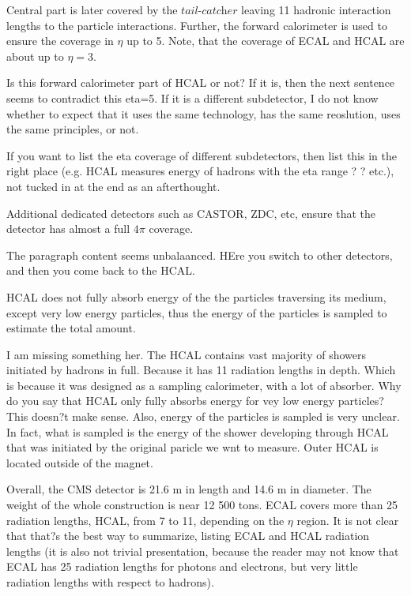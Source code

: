    
   Central part is later covered by the $\textit{tail-catcher}$ leaving 11 hadronic interaction lengths to the particle interactions.  
Further, the forward calorimeter is used to ensure the coverage in $\eta$ up to 5. Note, that the coverage of ECAL and HCAL are about up to $\eta=3$.  

Is this forward calorimeter part of HCAL or not? If it is, then the next sentence seems to contradict this eta=5. If it is a different subdetector, I do not know whether to expect that it uses the same technology, has the same reoslution, uses the same principles, or not.


If you want to list the eta coverage of different subdetectors, then list this in the right place (e.g. HCAL measures energy of hadrons with the eta range ? ? etc.), not tucked in at the end as an afterthought. 




Additional dedicated detectors such as  CASTOR, ZDC, etc, ensure that the detector has almost a full $4\pi$ coverage. 

The paragraph content seems unbalaanced. HEre you switch to other detectors, and then you come back to the HCAL.

HCAL does not fully absorb energy of the the particles traversing its medium, except very low energy particles, thus the energy of the particles is sampled to estimate the total amount.  

I am missing something her. The HCAL contains vast majority of showers initiated by hadrons in full. Because it has 11 radiation lengths in depth. Which is because it was designed as a sampling calorimeter, with a lot of absorber. Why do you say that HCAL only fully absorbs energy for vey low energy particles? This doesn?t make sense.
   Also, energy of the particles is sampled is very unclear. In fact, what is sampled is the energy of the shower developing through HCAL that was initiated by the original paricle we wnt to measure.  Outer HCAL is located outside of the magnet.

   
   
   
Overall, the CMS detector is 21.6 m in length and 14.6 m in diameter. The weight of the whole construction is near 12 500 tons. ECAL covers more than 25 radiation lengths, HCAL, from 7 to 11, depending on the $\eta$ region. 
It is not clear that that?s the best way to summarize, listing ECAL and HCAL radiation lengths (it is also not trivial presentation, because the reader may not know that ECAL has 25 radiation lengths for photons and electrons, but very little radiation lengths with respect to hadrons). 


